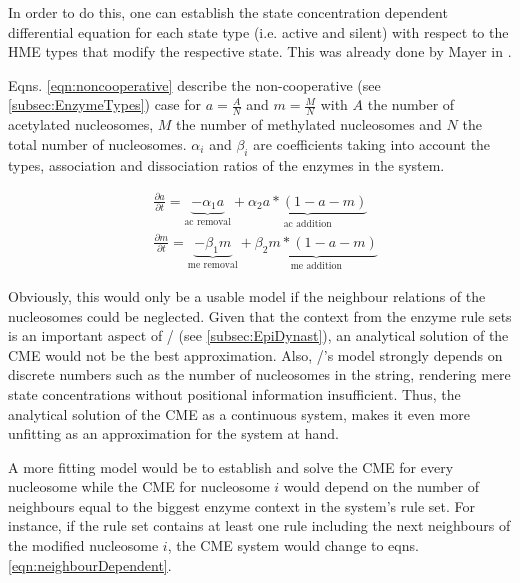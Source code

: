             In order to do this, one can establish the state concentration dependent differential equation \cite{lemons1908paper} for each state type (i.e. active and silent) with respect to the HME types that modify the respective state. This was already done by Mayer in \cite{mayer2020langevin}.

            Eqns. \ref{eqn:noncooperative} describe the non-cooperative (see \ref{subsec:EnzymeTypes}) case for $a = \frac{A}{N}$ and $m = \frac{M}{N}$ with $A$ the number of acetylated nucleosomes, $M$ the number of methylated nucleosomes and $N$ the total number of nucleosomes. $\alpha_i$ and $\beta_i$ are coefficients taking into account the types, association and dissociation ratios of the enzymes in the system. %

            \begin{subequations}
                \begin{align}
                    &\frac{\partial a}{\partial t} = \underbrace{- \alpha_1 a }_{\textrm{ac removal}} + \underbrace{ \alpha_2 a*(1-a-m) }_{\textrm{ac addition}}\\
                    &\frac{\partial m}{\partial t} = \underbrace{- \beta_1 m }_{\textrm{me removal}} + \underbrace{ \beta_2 m*(1-a-m) }_{\textrm{me addition}}
                \end{align}
                \label{eqn:noncooperative}
            \end{subequations}

            Obviously, this would only be a usable model if the neighbour relations of the nucleosomes could be neglected. Given that the context from the enzyme rule sets is an important aspect of \ed/ (see \ref{subsec:EpiDynast}), an analytical solution of the CME would not be the best approximation. Also, \ed/'s model strongly depends on discrete numbers such as the number of nucleosomes in the string, rendering mere state concentrations without positional information insufficient. Thus, the analytical solution of the CME as a continuous system, makes it even more unfitting as an approximation for the system at hand.

            A more fitting model would be to establish and solve the CME for every nucleosome while the CME for nucleosome $i$ would depend on the number of neighbours equal to the biggest enzyme context in the system's rule set. For instance, if the rule set contains at least one rule including the next neighbours of the modified nucleosome $i$, the CME system would change to eqns. \ref{eqn:neighbourDependent}.

